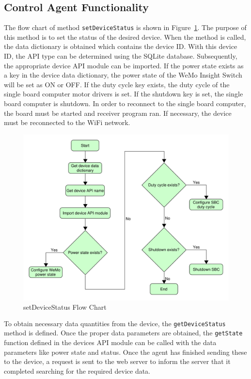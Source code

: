 \subsection{Control Agent Functionality}
The flow chart of method \texttt{setDeviceStatus} is shown in Figure~\ref{fig:setDeviceStatus}. The purpose of this method is to set the status of the desired device. When the method is called, the data dictionary is obtained which contains the device ID. With this device ID, the API type can be determined using the SQLite database. Subsequently, the appropriate device API module can be imported. If the power state exists as a key in the device data dictionary, the power state of the WeMo Insight Switch will be set as ON or OFF. If the duty cycle key exists, the duty cycle of the single board computer motor drivers is set. If the shutdown key is set, the single board computer is shutdown. In order to reconnect to the single board computer, the board must be started and receiver program ran. If necessary, the device must be reconnected to the WiFi network.  
\begin{figure}[H]
    \centering
    \includegraphics[scale=0.5]{figs/setDeviceStatus.pdf}
    \caption{setDeviceStatus Flow Chart}
    \label{fig:setDeviceStatus}
\end{figure}
To obtain necessary data quantities from the device, the \texttt{getDeviceStatus} method is defined. Once the proper data parameters are obtained, the \texttt{getState} function defined in the devices API module can be called with the data parameters like power state and status. Once the agent has finished sending these to the device, a request is sent to the web server to inform the server that it completed searching for the required device data.

